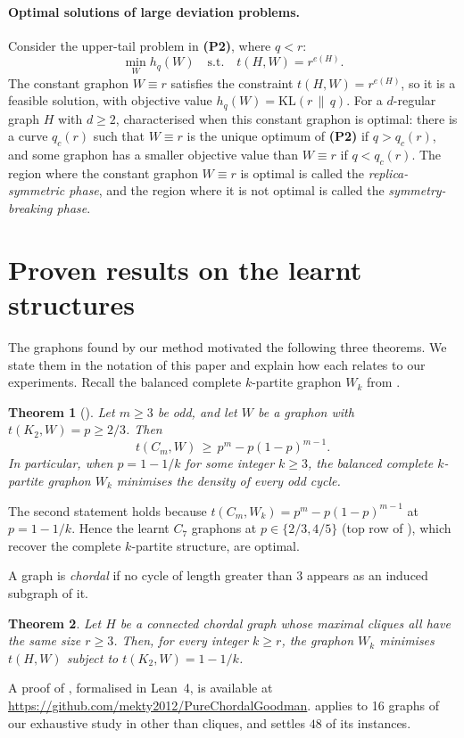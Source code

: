\documentclass[11pt]{article}
\theoremstyle{plain}
\newtheorem{theorem}{Theorem}[section]
\theoremstyle{definition}
\theoremstyle{remark}
\begin{document}
\paragraph{Optimal solutions of large deviation problems.}
Consider the upper-tail problem in \textbf{(P2)}, where $q < r$:
\[
\min_{W} h_q(W) \quad \text{s.t.} \quad t(H, W) = r^{e(H)}.
\]
The constant graphon $W \equiv r$ satisfies the constraint $t(H, W) = r^{e(H)}$, so it is a feasible solution, with objective value $h_q(W) = \mathrm{KL}(r \,\|\, q)$. For a $d$-regular graph $H$ with $d \ge 2$, \citet{lubetzky2015replica} characterised when this constant graphon is optimal: there is a curve $q_c(r)$ such that $W \equiv r$ is the unique optimum of \textbf{(P2)} if $q > q_c(r)$, and some graphon has a smaller objective value than $W \equiv r$ if $q < q_c(r)$. The region where the constant graphon $W \equiv r$ is optimal is called the \emph{replica-symmetric phase}, and the region where it is not optimal is called the \emph{symmetry-breaking phase}.

\section{Proven results on the learnt structures}\label{sec:proven}

The graphons found by our method motivated the following three theorems. We state them in the notation of this paper and explain how each relates to our experiments. Recall the balanced complete $k$-partite graphon $W_k$ from .

\begin{theorem}[\citealp{im2026goodman}]\label{thm:oddcycle}
Let $m \ge 3$ be odd, and let $W$ be a graphon with $t(K_2, W) = p \ge 2/3$. Then
\[
t(C_m, W) \,\ge\, p^m - p(1-p)^{m-1}.
\]
In particular, when $p = 1 - 1/k$ for some integer $k \ge 3$, the balanced complete $k$-partite graphon $W_k$ minimises the density of every odd cycle.
\end{theorem}
The second statement holds because $t(C_m, W_k) = p^m - p(1-p)^{m-1}$ at $p = 1 - 1/k$. Hence the learnt $C_7$ graphons at $p \in \{2/3, 4/5\}$ (top row of ), which recover the complete $k$-partite structure, are optimal.

A graph is \emph{chordal} if no cycle of length greater than $3$ appears as an induced subgraph of it.
\begin{theorem}\label{thm:chordal}
Let $H$ be a connected chordal graph whose maximal cliques all have the same size $r \ge 3$. Then, for every integer $k \ge r$, the graphon $W_k$ minimises $t(H, W)$ subject to $t(K_2, W) = 1 - 1/k$.
\end{theorem}
A proof of , formalised in Lean~4, is available at \url{https://github.com/mekty2012/PureChordalGoodman}.  applies to 16 graphs of our exhaustive study in  other than cliques, and settles $48$ of its instances.
\end{document}
